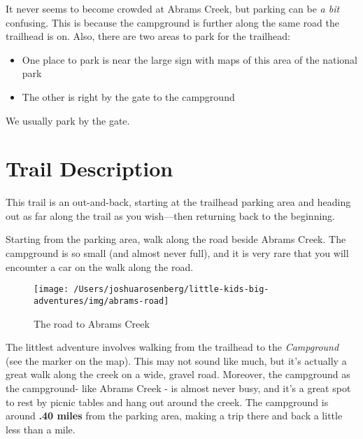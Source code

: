 \documentclass[
]{book}
\providecommand{\tightlist}{%
  \setlength{\itemsep}{0pt}\setlength{\parskip}{0pt}}
\begin{document}
It never seems to become crowded at Abrams Creek, but parking can be \emph{a bit}
confusing. This is because the campground is further along the same road the
trailhead is on. Also, there are two areas to park for the trailhead:

\begin{itemize}
\tightlist
\item
  One place to park is near the large sign with maps of this area of the national park\\
\item
  The other is right by the gate to the campground
\end{itemize}

We usually park by the gate.

\hypertarget{trail-description-13}{%
\section{Trail Description}\label{trail-description-13}}

This trail is an out-and-back, starting at the trailhead parking area and heading out as far
along the trail as you wish---then returning back to the beginning.

Starting from the parking area, walk along the road beside Abrams Creek. The
campground is so small (and almost never full), and it is very rare that you
will encounter a car on the walk along the road.

\begin{figure}

{\centering \texttt{[image: /Users/joshuarosenberg/little-kids-big-adventures/img/abrams-road]} 

}

\caption{The road to Abrams Creek}\label{fig:unnamed-chunk-38}
\end{figure}

The littlest adventure involves walking from the trailhead to the \emph{Campground}
(see the marker on the map). This may not sound like much, but it's actually a great walk
along the creek on a wide, gravel road. Moreover, the campground as the
campground- like Abrams Creek - is almost never busy, and it's a great spot to
rest by picnic tables and hang out around the creek. The campground is around
\textbf{.40 miles} from the parking area, making a trip there and back a little less
than a mile.
\end{document}
